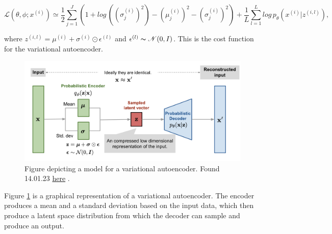 \begin{equation}\label{eq:loss_vae}
    \mathcal{L}(\theta, \phi;x^{(i)}) \simeq \frac{1}{2}\sum_{j=1}^{J}(1 + log\, ((\sigma^{(i)}_{j})^2) - (\mu^{(i)}_{j})^2 - (\sigma^{(i)}_{j})^2) +\frac{1}{L}\sum_{l=1}^{L}log\, p_{\theta}(x^{(i)}|z^{(i,l)}),
\end{equation}

where $z^{(i,l)} = \mu^{(i)} + \sigma^{(i)} \odot \epsilon^{(l)}$ and $ \epsilon^{(l)} \thicksim \mathcal{N}(0,I)$. This is the 
cost function for the variational autoencoder. 

\begin{figure}[H]
    \includegraphics[width=\linewidth]{Figures/Machinelearning/vae-gaussian.png}
    \caption{Figure depicting a model for a variational autoencoder. Found 14.01.23 \href{https://lilianweng.github.io/posts/2018-08-12-vae/vae-gaussian.png}{here} \cite{weng2018VAE}. }
    \label{fig:vae}
\end{figure}

Figure \ref{fig:vae} is a graphical representation of a variational autoencoder. The encoder produces a mean and a standard deviation based on the input data,
which then produce a latent space distribution from which the decoder can sample and produce an output. 

